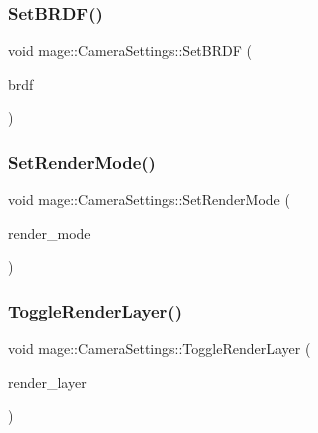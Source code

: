 \subsubsection{\texorpdfstring{Set\+B\+R\+D\+F()}{SetBRDF()}}
{\footnotesize\ttfamily void mage\+::\+Camera\+Settings\+::\+Set\+B\+R\+DF (\begin{DoxyParamCaption}\item[{\hyperlink{namespacemage_ae7a7a03a7b34d7e2689689bb8295cd38}{B\+R\+D\+F\+Type}}]{brdf }\end{DoxyParamCaption})\hspace{0.3cm}{\ttfamily [noexcept]}}

\hypertarget{classmage_1_1_camera_settings_ab0d6720a08e88e018c2a2e6097933d98}{}\label{classmage_1_1_camera_settings_ab0d6720a08e88e018c2a2e6097933d98} 
\subsubsection{\texorpdfstring{Set\+Render\+Mode()}{SetRenderMode()}}
{\footnotesize\ttfamily void mage\+::\+Camera\+Settings\+::\+Set\+Render\+Mode (\begin{DoxyParamCaption}\item[{\hyperlink{namespacemage_a5e7e18b0154373ce8fc942fe3f6b27fd}{Render\+Mode}}]{render\+\_\+mode }\end{DoxyParamCaption})\hspace{0.3cm}{\ttfamily [noexcept]}}

\hypertarget{classmage_1_1_camera_settings_a47c34af7eddc2a0f6256d137b5813a4c}{}\label{classmage_1_1_camera_settings_a47c34af7eddc2a0f6256d137b5813a4c} 
\subsubsection{\texorpdfstring{Toggle\+Render\+Layer()}{ToggleRenderLayer()}}
{\footnotesize\ttfamily void mage\+::\+Camera\+Settings\+::\+Toggle\+Render\+Layer (\begin{DoxyParamCaption}\item[{\hyperlink{namespacemage_a8b4a82582105b0299e2c2be5af7255d6}{Render\+Layer}}]{render\+\_\+layer }\end{DoxyParamCaption})\hspace{0.3cm}{\ttfamily [noexcept]}}



